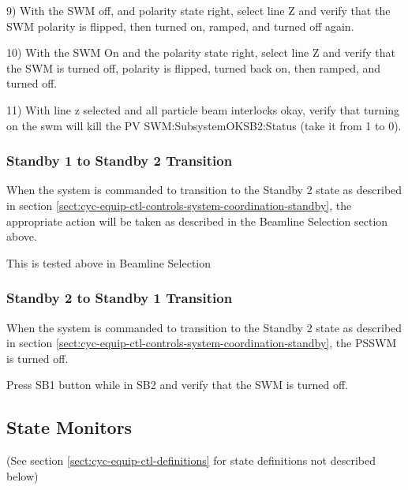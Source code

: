 \documentclass[11pt]{book}		%
\begin{document}
9) With the SWM off, and polarity state right, select line Z and verify that the SWM polarity is flipped, then turned on, ramped, and turned off again.

10) With the SWM On and the polarity state right, select line Z and verify that the SWM is turned off, polarity is flipped, turned back on, then ramped, and turned off.

11) With line z selected and all particle beam interlocks okay, verify that turning on the swm will kill the PV SWM:SubsystemOKSB2:Status (take it from 1 to 0).

\color{black}

\subsubsection{Standby 1 to Standby 2 Transition}

When the system is commanded to transition to the Standby 2 state as described in section \ref{sect:cyc-equip-ctl-controls-system-coordination-standby}, the appropriate action will be taken as described in the Beamline Selection section above.

\color{red}

This is tested above in Beamline Selection

\color{black}

\subsubsection{Standby 2 to Standby 1 Transition}

When the system is commanded to transition to the Standby 2 state as described in section \ref{sect:cyc-equip-ctl-controls-system-coordination-standby}, the PSSWM is turned off.

\color{red}

Press SB1 button while in SB2 and verify that the SWM is turned off.

\color{black}


\subsection{State Monitors} \label{sect:cyc-equip-ctl-beamline-gcc-state-monitors}
(See section \ref{sect:cyc-equip-ctl-definitions} for state definitions not described below)
\end{document}
